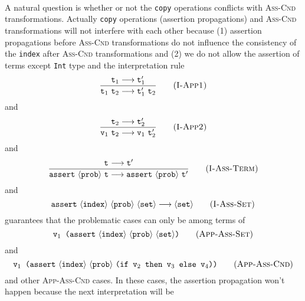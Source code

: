 \documentclass[a4paper]{article}
\begin{document}
\paragraph{}
A natural question is whether or not the \texttt{copy} operations conflicts with \textsc{Ass-Cnd} transformations. Actually \texttt{copy} operations (assertion propagations) and \textsc{Ass-Cnd} transformations will not interfere with each other because (1) assertion propagations before \textsc{Ass-Cnd} transformations do not influence the consistency of the \texttt{index} after \textsc{Ass-Cnd} transformations and (2) we do not allow the assertion of terms except \texttt{Int} type and the interpretation rule
\begin{equation}
	\frac{\text{\tt t}_{1}\longrightarrow\text{\tt t}^{\prime}_{1}}
	{\text{\tt t}_{1}\ \text{\tt t}_{2}\longrightarrow\text{\tt t}^{\prime}_{1}\ \text{\tt t}_{2}}
	\tag{\sc I-App1}
\end{equation}
and
\begin{equation}
	\frac{\text{\tt t}_{2}\longrightarrow\text{\tt t}^{\prime}_{2}}
	{\text{\tt v}_{1}\ \text{\tt t}_{2}\longrightarrow\text{\tt v}_{1}\ \text{\tt t}^{\prime}_{2}}
	\tag{\sc I-App2}
\end{equation}
and
\begin{equation}
	\frac{\text{\tt t}_{}\longrightarrow\text{\tt t}^{\prime}_{}}
	{\text{\tt assert}\ \langle\text{\tt prob}\rangle\ \text{\tt t}\longrightarrow\text{\tt assert}\ \langle\text{\tt prob}\rangle\ \text{\tt t}^\prime}
	\tag{\sc I-Ass-Term}
\end{equation}
and
\begin{equation}
	\text{\tt assert}\ \langle\text{\tt index}\rangle\ \langle\text{\tt prob}\rangle\ \langle\text{\tt set}\rangle\longrightarrow\langle\text{\tt set}\rangle
	\tag{\sc I-Ass-Set}
\end{equation}
guarantees that the problematic cases can only be among terms of
\begin{equation}
\text{\tt v$_1$ (assert}\ \langle\text{\tt index}\rangle\ \langle\text{\tt prob}\rangle\ \langle\text{\tt set}\rangle\text{\tt )}
\tag{\textsc{App-Ass-Set}}
\end{equation}
and
\begin{equation}
\text{\tt v$_1$ (assert}\ \langle\text{\tt index}\rangle\ \langle\text{\tt prob}\rangle\ \text{\tt (if v$_2$ then v$_3$ else v$_4$))}
\tag{\textsc{App-Ass-Cnd}}
\end{equation}
and other \textsc{App-Ass-Cnd} cases. In these cases, the assertion propagation won't happen because the next interpretation will be
\end{document}
